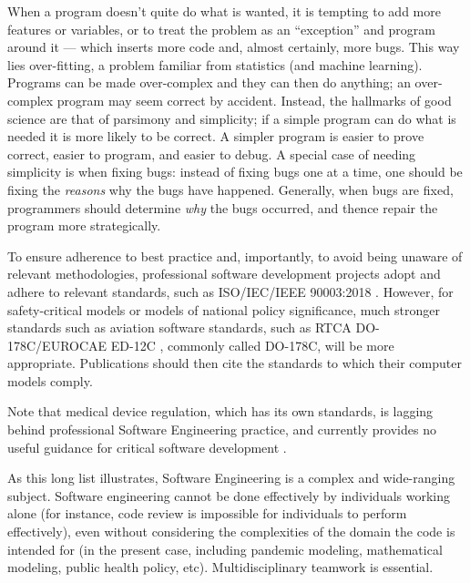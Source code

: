 \documentclass[10pt,a4paper]{article}
\begin{document}
When a program doesn't quite do what is wanted, it is tempting to add more features or variables, or to treat the problem as an ``exception'' and program around it --- which inserts more code and, almost certainly, more bugs. This way lies over-fitting, a problem familiar from statistics (and machine learning). Programs can be made over-complex and they can then do anything; an over-complex program may seem correct by accident. Instead, the hallmarks of good science are that of parsimony and simplicity; if a simple program can do what is needed it is more likely to be correct. A simpler program is easier to prove correct, easier to program, and easier to debug. A special case of needing simplicity is when fixing bugs: instead of fixing bugs one at a time, one should be fixing the \emph{reasons\/} why the bugs have happened. Generally, when bugs are fixed, programmers should determine \emph{why\/} the bugs occurred, and thence repair the program more strategically.



To ensure adherence to best practice and, importantly, to avoid being unaware of relevant methodologies, professional software development projects adopt and adhere to relevant standards, such as ISO/IEC/IEEE 90003:2018 \cite{iso}. However, for safety-critical models or models of national policy significance, much stronger standards such as aviation software standards, such as RTCA DO-178C/EUROCAE ED-12C \cite{178C}, commonly called DO-178C, will be more appropriate. Publications should then cite the  standards to which their computer models comply. 

Note that medical device regulation, which has its own standards, is lagging behind professional Software Engineering practice, and currently provides no useful guidance for critical software development \cite{fixit}.


As this long list illustrates, Software Engineering is a complex and wide-ranging subject. Software engineering cannot be done effectively by individuals working alone (for instance, code review is impossible for individuals to perform effectively), even without considering the complexities of the domain the code is intended for (in the present case, including pandemic modeling, mathematical modeling, public health policy, etc). Multidisciplinary teamwork is essential.
\end{document}
